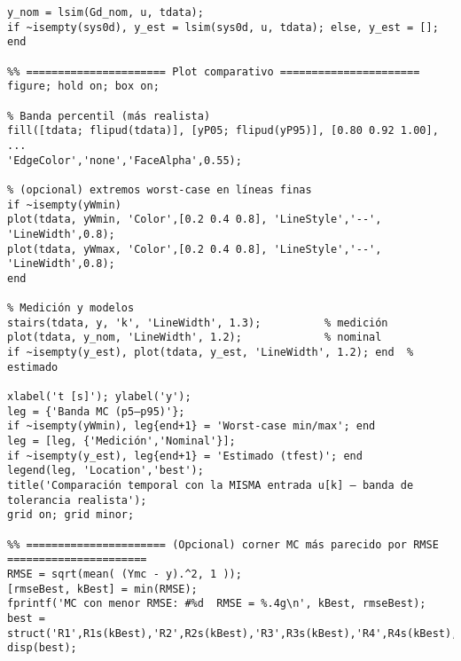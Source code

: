 \begin{lstlisting}[style=matlabstyle,caption={Script para la comparación de la planta en lazo abierto nominal vs mediciones.},label={matlab:openLoop}]
%% ====================== Simulación nominal y estimado con misma u ======================
y_nom = lsim(Gd_nom, u, tdata);
if ~isempty(sys0d), y_est = lsim(sys0d, u, tdata); else, y_est = []; end

%% ====================== Plot comparativo ======================
figure; hold on; box on;

% Banda percentil (más realista)
fill([tdata; flipud(tdata)], [yP05; flipud(yP95)], [0.80 0.92 1.00], ...
'EdgeColor','none','FaceAlpha',0.55);

% (opcional) extremos worst-case en líneas finas
if ~isempty(yWmin)
plot(tdata, yWmin, 'Color',[0.2 0.4 0.8], 'LineStyle','--', 'LineWidth',0.8);
plot(tdata, yWmax, 'Color',[0.2 0.4 0.8], 'LineStyle','--', 'LineWidth',0.8);
end

% Medición y modelos
stairs(tdata, y, 'k', 'LineWidth', 1.3);          % medición
plot(tdata, y_nom, 'LineWidth', 1.2);             % nominal
if ~isempty(y_est), plot(tdata, y_est, 'LineWidth', 1.2); end  % estimado

xlabel('t [s]'); ylabel('y');
leg = {'Banda MC (p5–p95)'};
if ~isempty(yWmin), leg{end+1} = 'Worst-case min/max'; end
leg = [leg, {'Medición','Nominal'}];
if ~isempty(y_est), leg{end+1} = 'Estimado (tfest)'; end
legend(leg, 'Location','best');
title('Comparación temporal con la MISMA entrada u[k] — banda de tolerancia realista');
grid on; grid minor;

%% ====================== (Opcional) corner MC más parecido por RMSE ======================
RMSE = sqrt(mean( (Ymc - y).^2, 1 ));
[rmseBest, kBest] = min(RMSE);
fprintf('MC con menor RMSE: #%d  RMSE = %.4g\n', kBest, rmseBest);
best = struct('R1',R1s(kBest),'R2',R2s(kBest),'R3',R3s(kBest),'R4',R4s(kBest),'C1',C1s(kBest),'C2',C2s(kBest));
disp(best);
\end{lstlisting}



